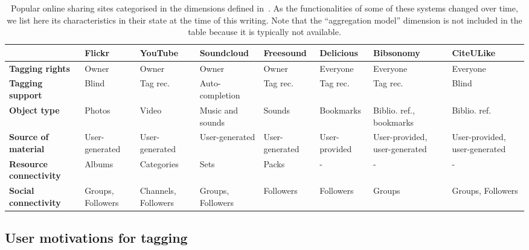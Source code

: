 \begin{table}
\begin{threeparttable}
\centering
{}
\tiny
\begin{tabular}{@{}P{1.5cm}P{1.1cm}P{1.1cm}P{1.2cm}P{1.2cm}P{1.2cm}P{1.2cm}P{1.2cm}@{}}%
\toprule
 & Flickr & YouTube & Soundcloud & Freesound & Delicious & Bibsonomy & CiteULike \\
 \midrule
\textbf{Tagging rights} & Owner & Owner & Owner & Owner & Everyone & Everyone & Everyone \\
\textbf{Tagging support} & Blind & Tag rec. & Auto-completion & Tag rec. & Tag rec. & Tag rec. & Blind \\
\textbf{Object type} & Photos & Video & Music and sounds & Sounds & Bookmarks & Biblio. ref., bookmarks & Biblio. ref. \\
\textbf{Source of material} & User-generated & User-generated & User-generated & User-generated & User-provided & User-provided, user-generated & User-provided, user-generated \\
\textbf{Resource connectivity} & Albums & Categories & Sets & Packs & - & - & - \\
\textbf{Social connectivity} & Groups, Followers & Channels, Followers & Groups, Followers & Followers & Followers & Groups & Groups, Followers \\
\bottomrule
\end{tabular}

\caption[Popular online sharing sites categorised in the dimensions defined in~\cite{marlow2006}]{Popular online sharing sites categorised in the dimensions defined in~\cite{marlow2006}. As the functionalities of some of these systems changed over time, we list here its characteristics in their state at the time of this writing. Note that the ``aggregation model'' dimension is not included in the table because it is typically not available.} 
\label{tab:tagging_systems_in_dimensions}
\end{threeparttable}
\end{table}



\subsection{User motivations for tagging}
\label{soa:user_motivations}

